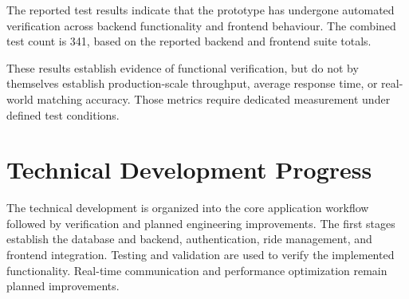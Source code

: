 \documentclass{tietreport}
\begin{document}
The reported test results indicate that the prototype has
undergone automated verification across backend functionality
and frontend behaviour. The combined test count is 341,
based on the reported backend and frontend suite totals.

These results establish evidence of functional verification,
but do not by themselves establish production-scale throughput,
average response time, or real-world matching accuracy.
Those metrics require dedicated measurement under defined
test conditions.

\section{Technical Development Progress}

The technical development is organized into the core application workflow
followed by verification and planned engineering improvements. The first
stages establish the database and backend, authentication, ride management,
and frontend integration. Testing and validation are used to verify the
implemented functionality. Real-time communication and performance
optimization remain planned improvements.
\end{document}
